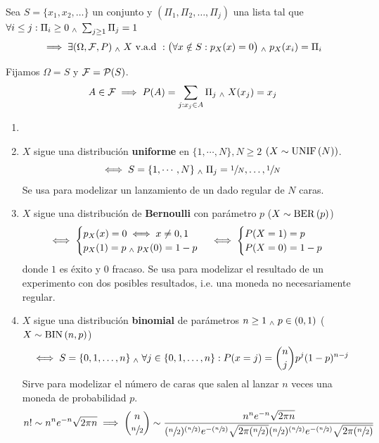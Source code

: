 \begin{teo}
	Sea $S=\{x_1, x_2, \dots \}$ un conjunto y $(\Pi_1, \Pi_2, \dots, \Pi_j)$ una lista tal que \\
	$\forall i \leq j : \Pi_i \geq 0 \; _{\wedge} \; \sum_{j\geq 1}\Pi_j=1$
	\[\implies \exists (\Omega, \mathcal{F}, P) \; _{\wedge} \; X\text{ v.a.d }:\big(\forall  x\notin S :p_X(x)= 0 \big) \; _{\wedge} \; p_X(x_i)=\Pi_i\]
	\begin{dem}
		Fijamos $\Omega = S$ y $\mathcal{F}=\mathcal{P}(S)$.
		\[A\in \mathcal{F} \implies P(A)=\sum_{j:x_j\in A}\Pi_j \; _{\wedge} \; X(x_j)=x_j\]
	\end{dem}
\end{teo}

\begin{ejem}
	\begin{enumerate}
		\item []
		\item $X$ sigue una distribución \textbf{uniforme} en $\{1, \cdots, N\}, N\geq2$ $(X\sim\operatorname{UNIF}\left(N\right))$.
		      \[\iff S=\{1, \cdots, N\} \; _{\wedge} \; {\Pi_j}={\sfrac{1}{N}, \dots, \sfrac{1}{N}}\]
		      Se usa para modelizar un lanzamiento de un dado regular de $N$ caras.
		\item $X$ sigue una distribución de \textbf{Bernoulli} con parámetro $p$ ($X\sim\operatorname{BER}\left(p\right)$)
		      \[\iff \begin{cases}
				      p_X(x)=0 \iff x\ne 0, 1 \\
				      p_X(1)=p \; _{\wedge} \; p_X(0)=1-p
			      \end{cases}\iff\begin{cases}
				      P(X=1)=p \\
				      P(X=0)=1-p
			      \end{cases}\]
		      donde $1$ es éxito y $0$ fracaso. Se usa para modelizar el resultado de un experimento con dos posibles resultados, i.e. una moneda no necesariamente regular.
		\item $X$ sigue una distribución \textbf{binomial} de parámetros $n\geq 1 \; _{\wedge} \; p\in (0, 1)$ ($X\sim\operatorname{BIN}\left(n, p\right)$)
		      \[\iff S=\{0, 1, \dots, n\} \; _{\wedge} \; \forall j\in \{0, 1, \dots, n\}:P(x=j)=\binom{n}{j}p^j(1-p)^{n-j}\]
		      Sirve para modelizar el número de caras que salen al lanzar $n$ veces una moneda de probabilidad $p$.
		      \[n! \sim n^ne^{-n}\sqrt{2\pi n}\implies \binom{n}{\sfrac{n}{2}}\sim\frac{n^ne^{-n}\sqrt{2\pi n}}{(\sfrac{n}        {2})^{(\sfrac{n}{2})}e^{-(\sfrac{n}{2})}\sqrt{2\pi (\sfrac{n}{2})}(\sfrac{n}{2})^{(\sfrac{n}{2})}e^{-(\sfrac{n}     {2})}\sqrt{2\pi (\sfrac{n}{2})}}\]


\end{enumerate}
\end{ejem}
